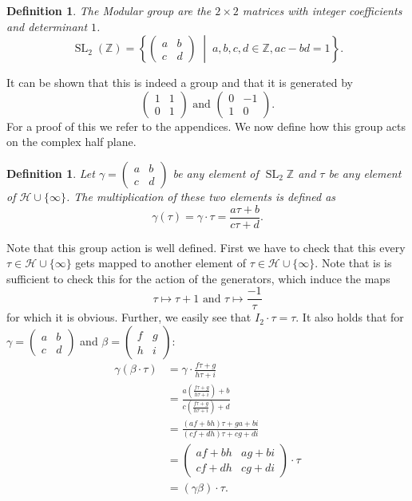 \documentclass[a4paper]{article}
\theoremstyle{theoremdd}
\theoremstyle{definitiondd}
\newtheorem{definition}[theorem]{Definition}
\theoremstyle{remarkdd}
\newcommand{\Z}{\mathbb{Z}}
\newcommand{\bigset}[2]{ \left\{ #1 \;\middle|\; #2 \right\} }
\DeclareMathOperator{\SL}{SL}
\begin{document}
\begin{definition}
	The \emph{Modular group} are the $2\times 2$ matrices with integer coefficients and determinant $1$.
	 \[
		 \SL_2(\Z) =   \bigset{\begin{pmatrix} a& b\\ c& d \end{pmatrix}}{a, b, c, d \in \Z, ac - bd = 1}
	.\] 
\end{definition}
It can be shown that this is indeed a group and that it is generated by \[
	\begin{pmatrix}  1 & 1 \\ 0 & 1 \end{pmatrix} 
	\text{ and }
	\begin{pmatrix} 0 & -1 \\ 1 & 0 \end{pmatrix} 
.\] 
For a proof of this we refer to the appendices. 
We now define how this group acts on the complex half plane. 
\begin{definition}
	Let  $\gamma = \begin{pmatrix} a & b \\ c & d \end{pmatrix} $ be any element of $\SL_2\Z$ and $\tau$ be any element of $\mathcal{H} \cup \{\infty\} $.
	The multiplication of these two elements is defined as 
	\[
		\gamma(\tau) = \gamma \cdot \tau = \frac{a \tau + b}{ c \tau + d}
	.\] 
\end{definition}
Note that this group action is well defined. First we have to check that this every $\tau \in \mathcal{H} \cup \{\infty\}  $ gets mapped to another element of $\tau \in \mathcal{H} \cup \{ \infty\}$. 
Note that is is sufficient to check this for the action of the generators, which induce the maps \[
\tau \mapsto  \tau+1 \text{ and } \tau \mapsto \frac{-1}{\tau}
\]
for which it is obvious.
Further, we easily see that $I_2 \cdot \tau = \tau$. 
It also holds that for $\gamma = \begin{pmatrix} a & b \\ c & d \end{pmatrix} $ and $\beta = \begin{pmatrix} f & g \\ h & i \end{pmatrix} $: 
\begin{align*}
	\gamma \left( \beta \cdot  \tau\right) &=  \gamma\cdot \frac{f\tau + g}{h \tau + i} \\
					       &= \frac{a\left( \frac{f \tau + g}{h\tau + i} \right) + b}{c \left( \frac{f \tau + g}{h \tau + i} \right) + d} \\	
					       &= \frac{(af + bh)\tau + ga + bi}{(cf + dh) \tau + cg + di} \\
					       &= \begin{pmatrix} af + bh & ag + bi \\ cf + dh & cg + di \end{pmatrix} \cdot \tau \\
					       &= (\gamma \beta)\cdot \tau 
.\end{align*}
\end{document}
